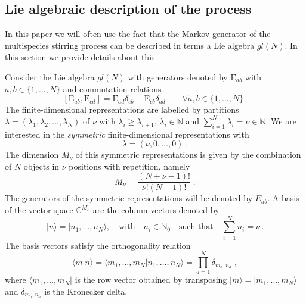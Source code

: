 \documentclass[10pt]{article}
\numberwithin{equation}{section}
\numberwithin{equation}{subsection}
\newcommand{\co}{\;,}
\newcommand{\dt}{\;.}
\newcommand{\EE}{\mathrm{E}}
\newcommand{\twoj}{\nu}
\begin{document}
\subsection{Lie algebraic description of the process}

In this paper we will often use the fact that the Markov generator of the multispecies stirring process can be described in terms a Lie algebra ${gl}(N)$.
In this section we provide details about this.

Consider the Lie algebra ${gl}(N)$ with generators denoted by $\EE_{ab}$ with $a,b\in \{1,\ldots,N\}$ and commutation relations
\begin{equation}\label{eq:comgl}
\left[\EE_{ab},\EE_{cd}\right]=\EE_{ad}\delta_{cb}-\EE_{cb}\delta_{ad}\qquad \forall a,b\in \{1,\ldots,N\}\,.
\end{equation}
The finite-dimensional representations are labelled by partitions $\lambda=(\lambda_1,\lambda_2,\ldots,\lambda_N)$ of $\nu$ with  $\lambda_i\geq \lambda_{i+1}$,  $\lambda_i\in \mathbb{N}$ and $\sum_{i=1}^N \lambda_i = \nu\in\mathbb{N}$.  
We are interested in the {\em symmetric} finite-dimensional representations with 
\begin{equation}\label{eq:dynkin}
    \lambda=(\twoj,0,\ldots,0) \;.
\end{equation} 
The dimension $M_\twoj$ of this symmetric representations is given by the combination of $N$ objects in $\twoj$ positions with repetition, namely
\begin{equation}
	M_\twoj= \frac{(N+\twoj-1)!}{\twoj  !(N-1)!}\dt
\end{equation} 
The generators of the symmetric representations will be denoted by $E_{ab}$.
A basis of the vector space $\mathbb{C}^{M_\twoj}$ are the column vectors denoted by
\begin{equation}
  |n\rangle=  |n_{1},\ldots,n_{N}\rangle,\quad \text{with}\quad n_{i}\in\mathbb{N}_{0}\quad \text{such that}\quad \sum_{i=1}^{N}n_{i}=\nu\,.
\end{equation}
The basis vectors satisfy the orthogonality relation
\begin{equation}\label{ortho}
   \langle m|n \rangle =\langle m_{1},\ldots,m_{N}|n_{1},\ldots,n_{N}\rangle=\prod_{a=1}^{N}\delta_{m_{a},n_{a}}\co
\end{equation}
where  $ \langle m_{1},\ldots,m_{N}|$ is the row vector obtained by transposing $|m\rangle=|m_{1},\ldots,m_{N}\rangle$ and $\delta_{m_{a},n_{a}}$ is the Kronecker delta. 
\end{document}
